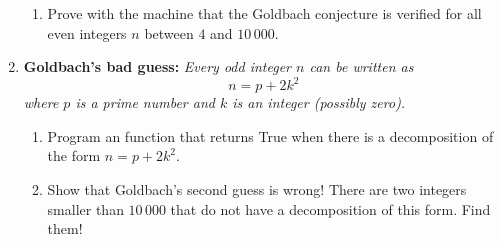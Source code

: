 \documentclass[11pt,class=report,crop=false]{standalone}
\begin{document}
\begin{activite}
\begin{enumerate}
\begin{enumerate}
   \item Prove with the machine that the Goldbach conjecture is verified for all even integers $n$ between $4$ and $10\,000$.
    
  \end{enumerate}
  
  \item \textbf{Goldbach's bad guess: } \emph{Every odd integer $n$ can be written as
  $$n = p + 2k^2$$
where $p$ is a prime number and $k$ is an integer (possibly zero).}
  
  \begin{enumerate}
    \item Program an  function that returns \og{}True\fg{} when there is a decomposition of the form $n=p+2k^2$.
    
    \item Show that Goldbach's second guess is wrong! There are two integers smaller than $10\,000$ that do not have a decomposition of this form. Find them!
  \end{enumerate} 
\end{enumerate}   
     
\end{activite}



\end{document}
